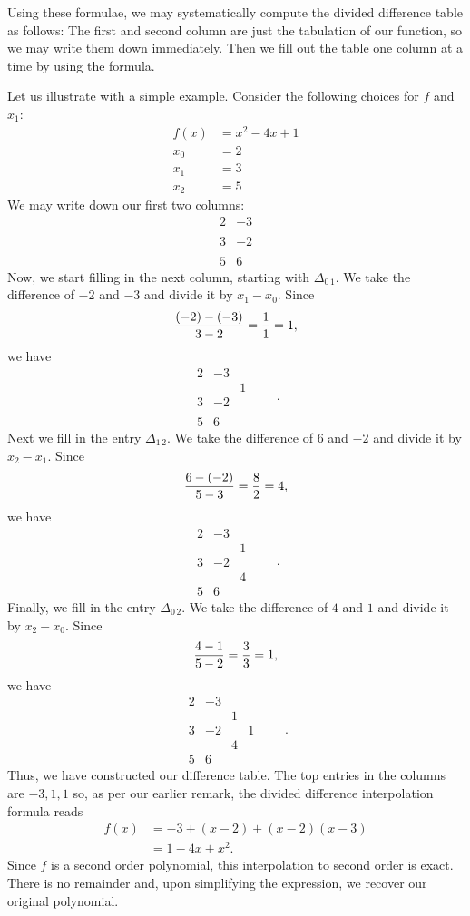 \documentclass[12pt]{article}
\begin{document}
Using these formulae, we may systematically compute the divided 
difference table as follows:  The first and second column are
just the tabulation of our function, so we may write them
down immediately.  Then we fill out the table one column at a 
time by using the formula.

Let us illustrate with a simple example.  Consider the following
choices for $f$ and $x_1$:
\begin{align*}
f(x) &= x^2 - 4 x + 1 \\
x_0 &= 2 \\
x_1 &= 3 \\
x_2 &= 5 
\end{align*}
We may write down our first two columns:
\[
\begin{matrix}
2 & -3 \\ \\
3 & -2 \\ \\
5 & 6
\end{matrix}
\]
Now, we start filling in the next column, starting with $\Delta_{0\,1}$.
We take the difference of $-2$ and $-3$ and divide it by $x_1 - x_0$.  Since
\[
{(-2) - (-3) \over 3 - 2} = {1 \over 1} = 1,
\]
we have
\[
\begin{matrix}
2 & -3  &\\ 
  &     & 1\\
3 & -2  & \\
  &     & \\
5 &  6  &
\end{matrix} \qquad.
\]
Next we fill in the entry $\Delta_{1\,2}$.  We take the difference of
$6$ and $-2$ and divide it by $x_2 - x_1$.  Since
\[
{6 - (-2) \over 5 - 3} = {8 \over 2} = 4,
\]
we have
\[
\begin{matrix}
2 & -3  &\\ 
  &     & 1 \\
3 & -2  & \\
  &     & 4 \\
5 &  6  &
\end{matrix} \qquad.
\]
Finally, we fill in the entry $\Delta_{0\,2}$.  We take the difference of
$4$ and $1$ and divide it by $x_2 - x_0$.  Since
\[
{4 - 1 \over 5 - 2} = {3 \over 3} = 1,
\]
we have
\[
\begin{matrix}
2 & -3  &   & \\ 
  &     & 1 & \\
3 & -2  &   & 1 \\
  &     & 4 &\\
5 &  6  &   &
\end{matrix} \qquad.
\]
Thus, we have constructed our difference table.
The top entries in the columns are $-3, 1, 1$ so,
as per our earlier remark, the divided difference
interpolation formula reads
\begin{align*}
f(x) &= -3 + (x - 2) + (x - 2) (x - 3) \\
&= 1 - 4 x + x^2.
\end{align*}
Since $f$ is a second order polynomial, this interpolation
to second order is exact.  There is no remainder and, upon
simplifying the expression, we recover our original polynomial.

\end{document}
